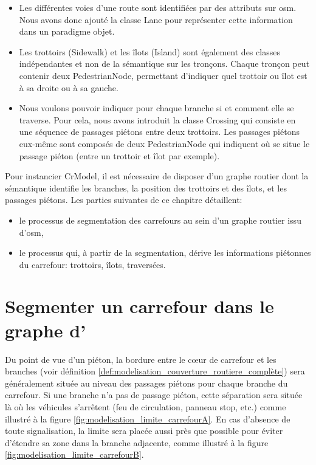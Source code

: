 \begin{itemize}
    \item Les différentes voies d'une route sont identifiées par des attributs sur \gls{osm}. Nous avons donc ajouté la classe Lane pour représenter cette information dans un paradigme objet.
    \item Les trottoirs (Sidewalk) et les îlots (Island) sont également des classes indépendantes et non de la sémantique sur les tronçons. Chaque tronçon peut contenir deux PedestrianNode, permettant d'indiquer quel trottoir ou îlot est à sa droite ou à sa gauche.
    \item Nous voulons pouvoir indiquer pour chaque branche si et comment elle se traverse. Pour cela, nous avons introduit la classe Crossing qui consiste en une séquence de passages piétons entre deux trottoirs. Les passages piétons eux-même sont composés de deux PedestrianNode qui indiquent où se situe le passage piéton (entre un trottoir et îlot par exemple).
\end{itemize}

\newpar{}

Pour instancier CrModel, il est nécessaire de disposer d'un graphe routier dont la sémantique identifie les branches, la position des trottoirs et des îlots, et les passages piétons. Les parties suivantes de ce chapitre détaillent:
\begin{itemize}
    \item le processus de segmentation des carrefours au sein d'un graphe routier issu d'\gls{osm},
    \item le processus qui, à partir de la segmentation, dérive les informations piétonnes du carrefour: trottoirs, îlots, traversées.
\end{itemize}

\section{Segmenter un carrefour dans le graphe d'}

\label{sec:modelisation_crseg}

Du point de vue d'un piéton, la bordure entre le cœur de carrefour et les branches (voir définition \ref{def:modelisation_couverture_routiere_complète}) sera généralement située au niveau des passages piétons pour chaque branche du carrefour. Si une branche n'a pas de passage piéton, cette séparation sera située là où les véhicules s'arrêtent (feu de circulation, panneau stop, etc.) comme illustré à la figure \ref{fig:modelisation_limite_carrefourA}. En cas d'absence de toute signalisation, la limite sera placée aussi près que possible pour éviter d'étendre sa zone dans la branche adjacente, comme illustré à la figure \ref{fig:modelisation_limite_carrefourB}.

